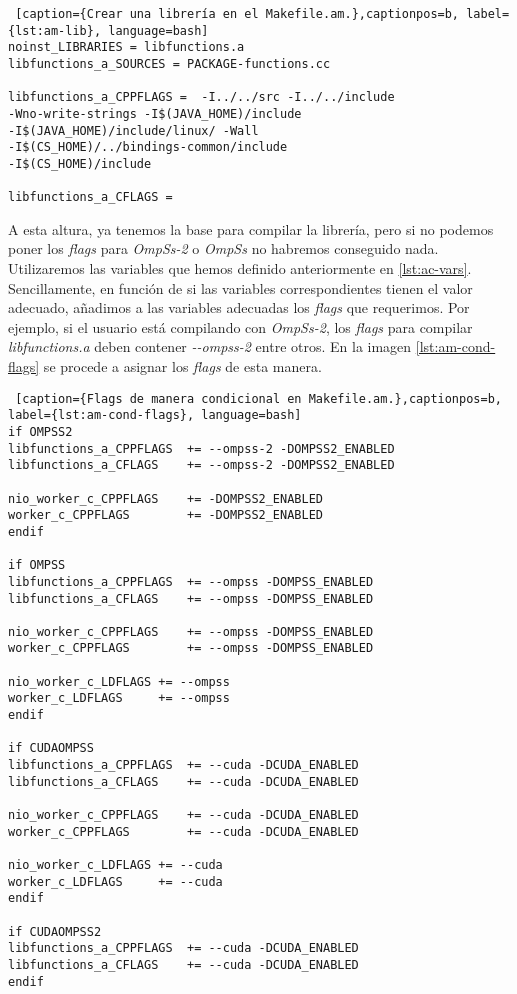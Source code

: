 \bigskip

\begin{minipage}{\linewidth}
\begin{lstlisting} [caption={Crear una librería en el Makefile.am.},captionpos=b, label={lst:am-lib}, language=bash]
noinst_LIBRARIES = libfunctions.a
libfunctions_a_SOURCES = PACKAGE-functions.cc

libfunctions_a_CPPFLAGS =  -I../../src -I../../include
-Wno-write-strings -I$(JAVA_HOME)/include 
-I$(JAVA_HOME)/include/linux/ -Wall
-I$(CS_HOME)/../bindings-common/include
-I$(CS_HOME)/include 

libfunctions_a_CFLAGS =
\end{lstlisting}
\end{minipage}

\par\bigskip
A esta altura, ya tenemos la base para compilar la librería, pero si no podemos poner los \textit{flags} para \textit{OmpSs-2} o \textit{OmpSs} no habremos conseguido nada. Utilizaremos las variables que hemos definido anteriormente en \ref{lst:ac-vars}. Sencillamente, en función de si las variables correspondientes tienen el valor adecuado, añadimos a las variables adecuadas los \textit{flags} que requerimos. Por ejemplo, si el usuario está compilando con \textit{OmpSs-2}, los \textit{flags} para compilar \textit{libfunctions.a} deben contener \textit{-{}-ompss-2} entre otros. En la imagen \ref{lst:am-cond-flags} se procede a asignar los \textit{flags} de esta manera.
\bigskip

\begin{minipage}{\linewidth}
\begin{lstlisting} [caption={Flags de manera condicional en Makefile.am.},captionpos=b, label={lst:am-cond-flags}, language=bash]
if OMPSS2
libfunctions_a_CPPFLAGS  += --ompss-2 -DOMPSS2_ENABLED
libfunctions_a_CFLAGS    += --ompss-2 -DOMPSS2_ENABLED

nio_worker_c_CPPFLAGS    += -DOMPSS2_ENABLED
worker_c_CPPFLAGS        += -DOMPSS2_ENABLED
endif

if OMPSS
libfunctions_a_CPPFLAGS  += --ompss -DOMPSS_ENABLED
libfunctions_a_CFLAGS    += --ompss -DOMPSS_ENABLED

nio_worker_c_CPPFLAGS    += --ompss -DOMPSS_ENABLED
worker_c_CPPFLAGS        += --ompss -DOMPSS_ENABLED

nio_worker_c_LDFLAGS += --ompss
worker_c_LDFLAGS     += --ompss
endif

if CUDAOMPSS
libfunctions_a_CPPFLAGS  += --cuda -DCUDA_ENABLED
libfunctions_a_CFLAGS    += --cuda -DCUDA_ENABLED

nio_worker_c_CPPFLAGS    += --cuda -DCUDA_ENABLED
worker_c_CPPFLAGS        += --cuda -DCUDA_ENABLED

nio_worker_c_LDFLAGS += --cuda
worker_c_LDFLAGS     += --cuda
endif

if CUDAOMPSS2
libfunctions_a_CPPFLAGS  += --cuda -DCUDA_ENABLED
libfunctions_a_CFLAGS    += --cuda -DCUDA_ENABLED
endif
\end{lstlisting}
\end{minipage}

